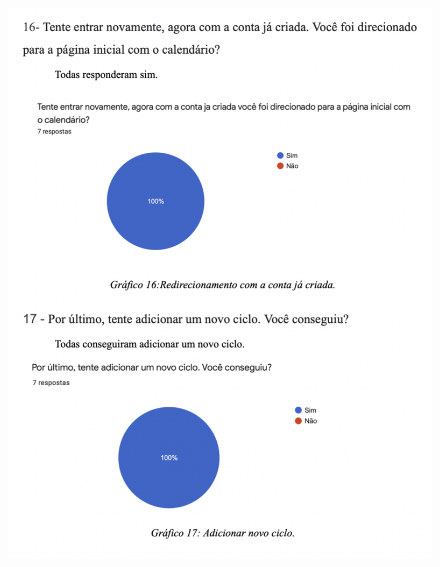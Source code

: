 \begin{apendicesenv}
\begin{figure}[ht]
        \includegraphics[keepaspectratio=true,scale=0.8]{figuras/ap9.png}
    \end{figure}
    \begin{figure}[ht]
        \centering

\end{figure}
\end{apendicesenv}
